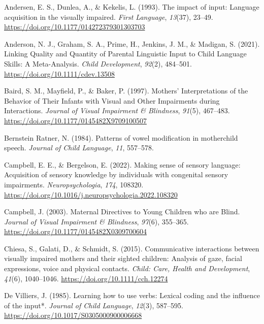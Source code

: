 \documentclass[
  man,floatsintext]{apa6}
\newlength{\cslhangindent}
\newlength{\cslentryspacingunit} %
\newenvironment{CSLReferences}[2] %
 {%
  \setlength{\parindent}{0pt}
  \ifodd #1
  \let\oldpar\par
  \def\par{\hangindent=\cslhangindent\oldpar}
  \fi
  \setlength{\parskip}{#2\cslentryspacingunit}
 }%
 {}
\begin{document}
\hypertarget{refs}{}
\begin{CSLReferences}{1}{0}
\leavevmode{}%
Andersen, E. S., Dunlea, A., \& Kekelis, L. (1993). The impact of input: Language acquisition in the visually impaired. \emph{First Language}, \emph{13}(37), 23--49. \url{https://doi.org/10.1177/014272379301303703}

\leavevmode{}%
Anderson, N. J., Graham, S. A., Prime, H., Jenkins, J. M., \& Madigan, S. (2021). Linking {Quality} and {Quantity} of {Parental Linguistic Input} to {Child Language Skills}: {A Meta-Analysis}. \emph{Child Development}, \emph{92}(2), 484--501. \url{https://doi.org/10.1111/cdev.13508}

\leavevmode{}%
Baird, S. M., Mayfield, P., \& Baker, P. (1997). Mothers' {Interpretations} of the {Behavior} of {Their Infants} with {Visual} and {Other Impairments} during {Interactions}. \emph{Journal of Visual Impairment \& Blindness}, \emph{91}(5), 467--483. \url{https://doi.org/10.1177/0145482X9709100507}

\leavevmode{}%
Bernstein Ratner, N. (1984). Patterns of vowel modification in mother\textendash child speech. \emph{Journal of Child Language}, \emph{11}, 557--578.

\leavevmode{}%
Campbell, E. E., \& Bergelson, E. (2022). Making sense of sensory language: {Acquisition} of sensory knowledge by individuals with congenital sensory impairments. \emph{Neuropsychologia}, \emph{174}, 108320. \url{https://doi.org/10.1016/j.neuropsychologia.2022.108320}

\leavevmode{}%
Campbell, J. (2003). Maternal {Directives} to {Young Children} who are {Blind}. \emph{Journal of Visual Impairment \& Blindness}, \emph{97}(6), 355--365. \url{https://doi.org/10.1177/0145482X0309700604}

\leavevmode{}%
Chiesa, S., Galati, D., \& Schmidt, S. (2015). Communicative interactions between visually impaired mothers and their sighted children: Analysis of gaze, facial expressions, voice and physical contacts. \emph{Child: Care, Health and Development}, \emph{41}(6), 1040--1046. \url{https://doi.org/10.1111/cch.12274}

\leavevmode{}%
De Villiers, J. (1985). Learning how to use verbs: Lexical coding and the influence of the input*. \emph{Journal of Child Language}, \emph{12}(3), 587--595. \url{https://doi.org/10.1017/S0305000900006668}


\end{CSLReferences}
\end{document}
